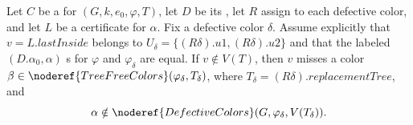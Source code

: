\begin{helper}
Let $C$ be a  for
$(G,k,e_0,\varphi,T)$, let $D$ be its
, let $R$ assign
 to each defective color, and let $L$ be
a  certificate for $\alpha$.  Fix a
defective color $\delta$.  Assume explicitly that
$v=L.\mathit{lastInside}$ belongs to
$U_\delta=\{(R\delta).u1,(R\delta).u2\}$ and that the labeled
$(D.\alpha_0,\alpha)$ s for $\varphi$ and
$\varphi_\delta$ are equal.  If $v\notin V(T)$, then $v$ misses a color
$\beta\in\noderef{TreeFreeColors}(\varphi_\delta,T_\delta)$, where
$T_\delta=(R\delta).\mathit{replacementTree}$, and
\[
 \alpha\notin\noderef{DefectiveColors}
       (G,\varphi_\delta,V(T_\delta)).
\]
\end{helper}
